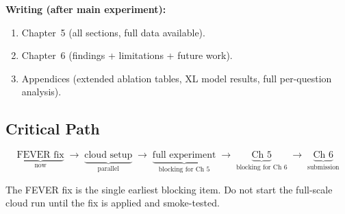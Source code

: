 \documentclass[12pt,a4paper]{article}
\begin{document}
\begin{mdframed}[style=infobox]
\textbf{Writing (after main experiment):}
\begin{enumerate}[noitemsep]
  \item Chapter~5 (all sections, full data available).
  \item Chapter~6 (findings + limitations + future work).
  \item Appendices (extended ablation tables, XL model results,
        full per-question analysis).
\end{enumerate}
\end{mdframed}

\subsection{Critical Path}

\[
\underbrace{\text{FEVER fix}}_{\text{now}} \;\to\;
\underbrace{\text{cloud setup}}_{\text{parallel}} \;\to\;
\underbrace{\text{full experiment}}_{\text{blocking for Ch~5}} \;\to\;
\underbrace{\text{Ch~5}}_{\text{blocking for Ch~6}} \;\to\;
\underbrace{\text{Ch~6}}_{\text{submission}}
\]

The FEVER fix is the single earliest blocking item.
Do not start the full-scale cloud run until the fix is applied and
smoke-tested.
\end{document}
